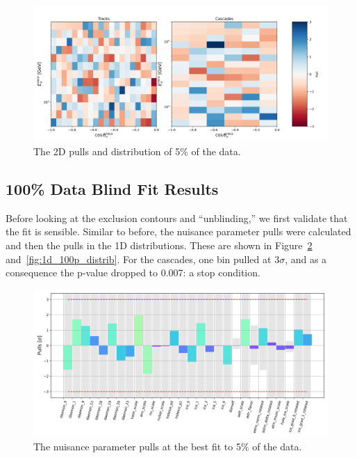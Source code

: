 \documentclass[main.tex]{subfiles}
\begin{document}
\begin{figure}
    \centering
    \includegraphics[width=0.9\linewidth]{./figures/blindfit/2dpulls_joint_data_5p_with_flavor_update_fix_IC86_data_five_percent.png}
    \caption{The 2D pulls and distribution of 5\% of the data.}\label{fig:2d_5p_distrib}
\end{figure}

\subsection{100\% Data Blind Fit Results}

Before looking at the exclusion contours and ``unblinding,'' we first validate that the fit is sensible. 
Similar to before, the nuisance parameter pulls were calculated and then the pulls in the 1D distributions. 
These are shown in Figure~\ref{fig:pulls_100p} and~\ref{fig:1d_100p_distrib}.
For the cascades, one bin pulled at $3\sigma$, and as a consequence the p-value dropped to 0.007: a stop condition. 

\begin{figure}
    \centering
    \includegraphics[width=0.9\linewidth]{./figures/pulls_IC86_data_full_joint_data_full.png}
    \caption{The nuisance parameter pulls at the best fit to 5\% of the data.}\label{fig:pulls_100p}
\end{figure}
\end{document}
